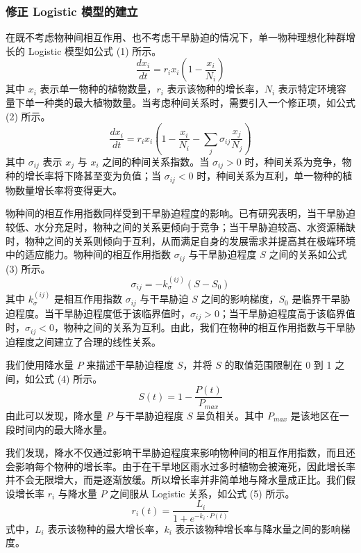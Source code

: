 \documentclass[11pt,a4paper]{ctexart}
\begin{document}
\subsubsection{修正 Logistic 模型的建立}

在既不考虑物种间相互作用、也不考虑干旱胁迫的情况下，单一物种理想化种群增长的 Logistic 模型如公式 (1) 所示。
\begin{equation}
\frac{dx_i}{dt}=r_i x_i\left(1-\frac{x_i}{N_i}\right)
\end{equation}
其中 $x_i$ 表示单一物种的植物数量，$r_i$ 表示该物种的增长率，$N_i$ 表示特定环境容量下单一种类的最大植物数量。当考虑种间关系时，需要引入一个修正项，如公式 (2) 所示。
\begin{equation}
\frac{dx_i}{dt}=r_i x_i\left(1-\frac{x_i}{N_i}-\sum_{j}\sigma_{ij}\frac{x_j}{N_j}\right)
\end{equation}
其中 $\sigma_{ij}$ 表示 $x_j$ 与 $x_i$ 之间的种间关系指数。当 $\sigma_{ij}>0$ 时，种间关系为竞争，物种的增长率将下降甚至变为负值；当 $\sigma_{ij}<0$ 时，种间关系为互利，单一物种的植物数量增长率将变得更大。

物种间的相互作用指数同样受到干旱胁迫程度的影响。已有研究表明，当干旱胁迫较低、水分充足时，物种之间的关系更倾向于竞争；当干旱胁迫较高、水资源稀缺时，物种之间的关系则倾向于互利，从而满足自身的发展需求并提高其在极端环境中的适应能力。物种间的相互作用指数 $\sigma_{ij}$ 与干旱胁迫程度 $S$ 之间的关系如公式 (3) 所示。
\begin{equation}
\sigma_{ij}=-k^{(ij)}_{\sigma}\left(S-S_0\right)
\end{equation}
其中 $k^{(ij)}_{\sigma}$ 是相互作用指数 $\sigma_{ij}$ 与干旱胁迫 $S$ 之间的影响梯度，$S_0$ 是临界干旱胁迫程度。当干旱胁迫程度低于该临界值时，$\sigma_{ij}>0$；当干旱胁迫程度高于该临界值时，$\sigma_{ij}<0$，物种之间的关系为互利。由此，我们在物种的相互作用指数与干旱胁迫程度之间建立了合理的线性关系。

我们使用降水量 $P$ 来描述干旱胁迫程度 $S$，并将 $S$ 的取值范围限制在 0 到 1 之间，如公式 (4) 所示。
\begin{equation}
S(t)=1-\frac{P(t)}{P_{max}}
\end{equation}
由此可以发现，降水量 $P$ 与干旱胁迫程度 $S$ 呈负相关。其中 $P_{max}$ 是该地区在一段时间内的最大降水量。

我们发现，降水不仅通过影响干旱胁迫程度来影响物种间的相互作用指数，而且还会影响每个物种的增长率。由于在干旱地区雨水过多时植物会被淹死，因此增长率并不会无限增大，而是逐渐放缓。所以增长率并非简单地与降水量成正比。我们假设增长率 $r_i$ 与降水量 $P$ 之间服从 Logistic 关系，如公式 (5) 所示。
\begin{equation}
r_i(t)=\frac{L_i}{1+e^{-k_i\cdot P(t)}}
\end{equation}
式中，$L_i$ 表示该物种的最大增长率，$k_i$ 表示该物种增长率与降水量之间的影响梯度。
\end{document}
